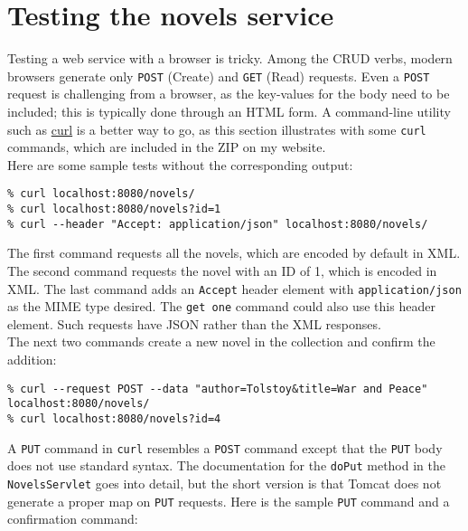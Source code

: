 \documentclass[12pt]{article}
\begin{document}
\section{Testing the novels service}

Testing a web service with a browser is tricky. Among the CRUD verbs, modern browsers generate only \verb|POST| (Create) and \verb|GET| (Read) requests. Even a \verb|POST| request is challenging from a browser, as the key-values for the body need to be included; this is typically done through an HTML form. A command-line utility such as \href{https://curl.haxx.se/}{curl} is a better way to go, as this section illustrates with some \verb|curl| commands, which are included in the ZIP on my website.\\

Here are some sample tests without the corresponding output:\\

\begin{lstlisting}
% curl localhost:8080/novels/
% curl localhost:8080/novels?id=1
% curl --header "Accept: application/json" localhost:8080/novels/

\end{lstlisting}

The first command requests all the novels, which are encoded by default in XML. The second command requests the novel with an ID of 1, which is encoded in XML. The last command adds an \verb|Accept| header element with \verb|application/json| as the MIME type desired. The \verb|get one| command could also use this header element. Such requests have JSON rather than the XML responses.\\

The next two commands create a new novel in the collection and confirm the addition:\\

\begin{lstlisting}
% curl --request POST --data "author=Tolstoy&title=War and Peace" localhost:8080/novels/
% curl localhost:8080/novels?id=4

\end{lstlisting}

A \verb|PUT| command in \verb|curl| resembles a \verb|POST| command except that the \verb|PUT| body does not use standard syntax. The documentation for the \verb|doPut| method in the \verb|NovelsServlet| goes into detail, but the short version is that Tomcat does not generate a proper map on \verb|PUT|  requests. Here is the sample \verb|PUT| command and a confirmation command:\\
\end{document}
